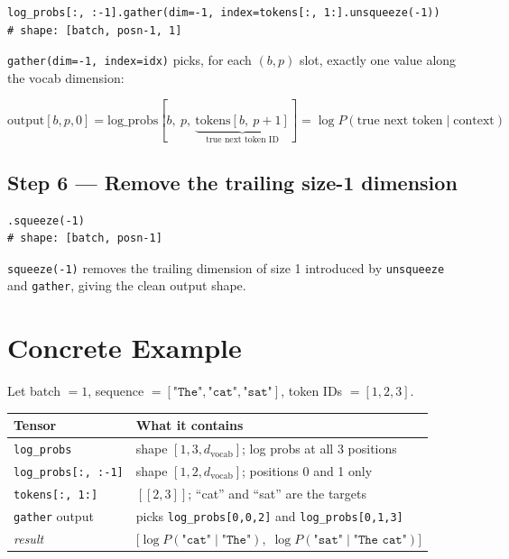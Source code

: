\documentclass[10pt]{article}
\begin{document}
\begin{lstlisting}
log_probs[:, :-1].gather(dim=-1, index=tokens[:, 1:].unsqueeze(-1))
# shape: [batch, posn-1, 1]
\end{lstlisting}

\texttt{gather(dim=-1, index=idx)} picks, for each $(b, p)$ slot, exactly one
value along the vocab dimension:

\[
  \text{output}[b, p, 0]
  = \text{log\_probs}[b,\ p,\ \underbrace{\text{tokens}[b,\ p+1]}_{\text{true next token ID}}]
  = \log P(\text{true next token} \mid \text{context})
\]

\subsection{Step 6 --- Remove the trailing size-1 dimension}

\begin{lstlisting}
.squeeze(-1)
# shape: [batch, posn-1]
\end{lstlisting}

\texttt{squeeze(-1)} removes the trailing dimension of size 1 introduced
by \texttt{unsqueeze} and \texttt{gather}, giving the clean output shape.

\section{Concrete Example}

Let batch $= 1$, sequence $= [\texttt{"The"}, \texttt{"cat"}, \texttt{"sat"}]$,
token IDs $= [1, 2, 3]$.

\begin{center}
\begin{tabular}{ll}
\toprule
\textbf{Tensor} & \textbf{What it contains} \\
\midrule
\texttt{log\_probs} & shape $[1, 3, d_\text{vocab}]$; log probs at all 3 positions \\
\texttt{log\_probs[:, :-1]} & shape $[1, 2, d_\text{vocab}]$; positions 0 and 1 only \\
\texttt{tokens[:, 1:]} & $[[2, 3]]$; ``cat'' and ``sat'' are the targets \\
\texttt{gather} output & picks \texttt{log\_probs[0,0,2]} and \texttt{log\_probs[0,1,3]} \\
\midrule
\textit{result} & $\bigl[\log P(\texttt{"cat"} \mid \texttt{"The"}),\;
                         \log P(\texttt{"sat"} \mid \texttt{"The cat"})\bigr]$ \\
\bottomrule
\end{tabular}
\end{center}
\end{document}
